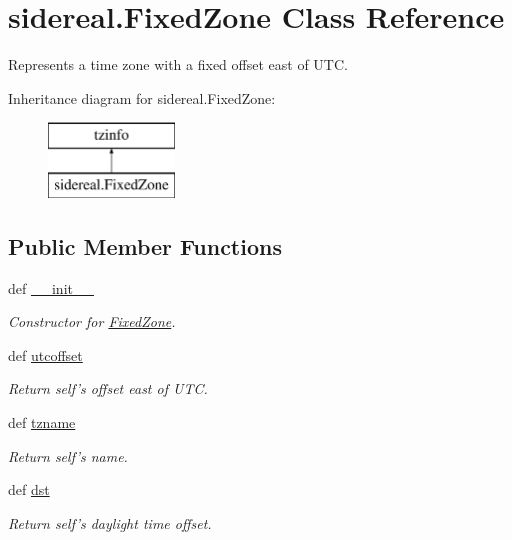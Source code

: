 \hypertarget{classsidereal_1_1_fixed_zone}{\section{sidereal.\-Fixed\-Zone Class Reference}
\label{classsidereal_1_1_fixed_zone}
}


Represents a time zone with a fixed offset east of U\-T\-C.  


Inheritance diagram for sidereal.\-Fixed\-Zone\-:\begin{figure}[H]
\begin{center}
\leavevmode
\includegraphics[height=2.000000cm]{d7/d61/classsidereal_1_1_fixed_zone}
\end{center}
\end{figure}
\subsection*{Public Member Functions}
\begin{DoxyCompactItemize}
\item 
def \hyperlink{classsidereal_1_1_fixed_zone_a1e99366c0c96fd4f7ea27735ccfec6e6}{\-\_\-\-\_\-init\-\_\-\-\_\-}
\begin{DoxyCompactList}\small\item\em Constructor for \hyperlink{classsidereal_1_1_fixed_zone}{Fixed\-Zone}. \end{DoxyCompactList}\item 
def \hyperlink{classsidereal_1_1_fixed_zone_a44e2aaa28a75279b5a3619ee02f1428d}{utcoffset}
\begin{DoxyCompactList}\small\item\em Return self's offset east of U\-T\-C. \end{DoxyCompactList}\item 
def \hyperlink{classsidereal_1_1_fixed_zone_a76f44703c82fe2ab9ed7d245a4b92d93}{tzname}
\begin{DoxyCompactList}\small\item\em Return self's name. \end{DoxyCompactList}\item 
def \hyperlink{classsidereal_1_1_fixed_zone_a4288527c2c4af727268455470160842d}{dst}
\begin{DoxyCompactList}\small\item\em Return self's daylight time offset. \end{DoxyCompactList}\end{DoxyCompactItemize}


